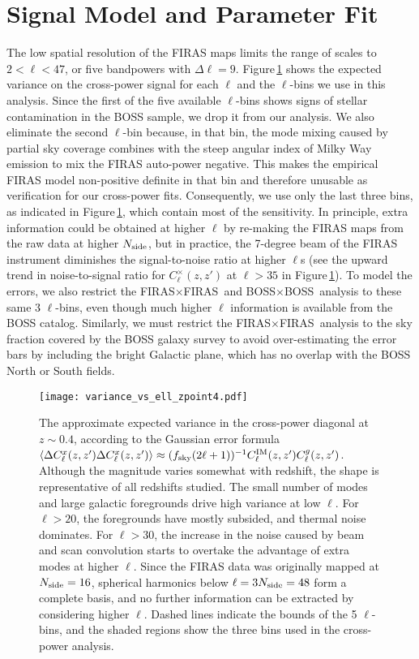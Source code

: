 \documentclass[fleqn,usenatbib]{mnras}
\newcommand{\FF}{FIRAS${\times}$FIRAS}
\newcommand{\BB}{BOSS${\times}$BOSS}
\begin{document}
\section{Signal Model and Parameter Fit}
\label{sec:signal model}

The low spatial resolution of the FIRAS maps limits the range of scales to $2 < \ell < 47$, or five bandpowers with $\Delta \ell = 9$. Figure\,\ref{fig:variance_vs_ell} shows the expected variance on the cross-power signal for each $\ell$ and the $\ell$-bins we use in this analysis. Since the first of the five available $\ell$-bins shows signs of stellar contamination in the BOSS sample, we drop it from our analysis. We also eliminate the second $\ell$-bin because, in that bin, the mode mixing caused by partial sky coverage combines with the steep angular index of Milky Way emission to mix the FIRAS auto-power negative. This makes the empirical FIRAS model non-positive definite in that bin and therefore unusable as verification for our cross-power fits. Consequently, we use only the last three bins, as indicated in Figure\,\ref{fig:variance_vs_ell}, which contain most of the sensitivity. In principle, extra information could be obtained at higher $\ell$ by re-making the FIRAS maps from the raw data at higher $N_{\rm side}$, but in practice, the 7-degree beam of the FIRAS instrument diminishes the signal-to-noise ratio at higher $\ell$s (see the upward trend in noise-to-signal ratio for $C_{\ell}^{\times}(z,z')$ at $\ell>35$ in Figure\,\ref{fig:variance_vs_ell}).
To model the errors, we also restrict the \FF\ and \BB\ analysis to these same 3 $\ell$-bins, even though much higher $\ell$ information is available from the BOSS catalog. Similarly, we must restrict the \FF\ analysis to the sky fraction covered by the BOSS galaxy survey to avoid over-estimating the error bars by including the bright Galactic plane, which has no overlap with the BOSS North or South fields.

\begin{figure}
  \texttt{[image: variance\_vs\_ell\_zpoint4.pdf]}
  \caption{ \label{fig:variance_vs_ell} The approximate expected variance in the cross-power diagonal at $z {\sim} 0.4$, according to the Gaussian error formula $\langle \Delta C^{x}_\ell(z,z') \Delta C^{x}_\ell(z,z') \rangle \approx (f_{\rm sky}(2\ell + 1))^{-1} C^{\rm IM}_\ell(z,z')C_{\ell}^g(z,z')$. Although the magnitude varies somewhat with redshift, the shape is representative of all redshifts studied. The small number of modes and large galactic foregrounds drive high variance at low $\ell$. For $\ell>20$, the foregrounds have mostly subsided, and thermal noise dominates. For $\ell > 30$, the increase in the noise caused by beam and scan convolution starts to overtake the advantage of extra modes at higher $\ell$. Since the FIRAS data was originally mapped at $N_{\rm side}=16$, spherical harmonics below $\ell=3N_{\rm side}=48$ form a complete basis, and no further information can be extracted by considering higher $\ell$. Dashed lines indicate the bounds of the 5 $\ell$-bins, and the shaded regions show the three bins used in the cross-power analysis.}
\end{figure}
\end{document}

